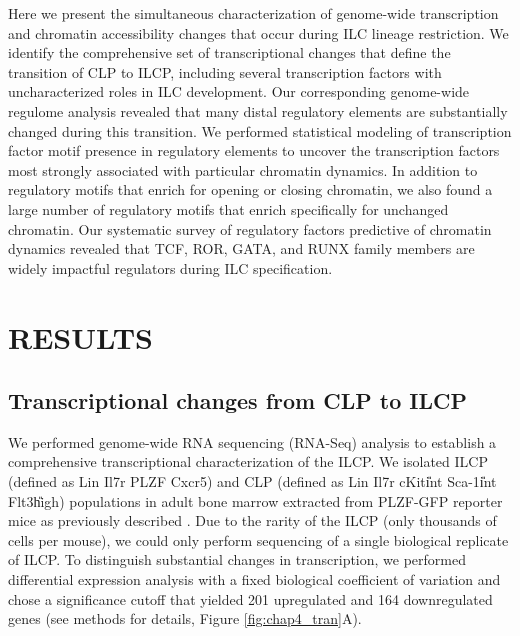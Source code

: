 Here we present the simultaneous characterization of genome-wide transcription and chromatin accessibility changes that occur during ILC lineage restriction. We identify the comprehensive set of transcriptional changes that define the transition of CLP to ILCP, including several transcription factors with uncharacterized roles in ILC development. Our corresponding genome-wide regulome analysis revealed that many distal regulatory elements are substantially changed during this transition. We performed statistical modeling of transcription factor motif presence in regulatory elements to uncover the transcription factors most strongly associated with particular chromatin dynamics. In addition to regulatory motifs that enrich for opening or closing chromatin, we also found a large number of regulatory motifs that enrich specifically for unchanged chromatin. Our systematic survey of regulatory factors predictive of chromatin dynamics revealed that TCF, ROR, GATA, and RUNX family members are widely impactful regulators during ILC specification. 


\section{RESULTS}

\subsection{Transcriptional changes from CLP to ILCP}

We performed genome-wide RNA sequencing (RNA-Seq) analysis to establish a comprehensive transcriptional characterization of the ILCP. We isolated ILCP (defined as Lin\UM{} Il7r\UP{} \ab\UP{} PLZF\UP{} Cxcr5\UM) and CLP (defined as Lin\UM{} Il7r\UP{} cKit\U{int} Sca-1\U{int} Flt3\U{high}) populations in adult bone marrow extracted from PLZF-GFP reporter mice as previously described \cite{constantinides2014}. Due to the rarity of the ILCP (only thousands of cells per mouse), we could only perform sequencing of a single biological replicate of ILCP. To distinguish substantial changes in transcription, we performed differential expression analysis with a fixed biological coefficient of variation and chose a significance cutoff that yielded 201 upregulated and 164 downregulated genes (see methods for details, Figure \ref{fig:chap4_tran}A).

